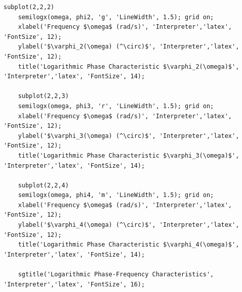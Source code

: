 \documentclass[a4paper, 12pt]{article}
\begin{document}
\begin{lstlisting}[label=task1, caption={Программа для задания 1}]
    subplot(2,2,2)
    semilogx(omega, phi2, 'g', 'LineWidth', 1.5); grid on;
    xlabel('Frequency $\omega$ (rad/s)', 'Interpreter','latex', 'FontSize', 12);
    ylabel('$\varphi_2(\omega) (^\circ)$', 'Interpreter','latex', 'FontSize', 12);
    title('Logarithmic Phase Characteristic $\varphi_2(\omega)$', 'Interpreter','latex', 'FontSize', 14);

    subplot(2,2,3)
    semilogx(omega, phi3, 'r', 'LineWidth', 1.5); grid on;
    xlabel('Frequency $\omega$ (rad/s)', 'Interpreter','latex', 'FontSize', 12);
    ylabel('$\varphi_3(\omega) (^\circ)$', 'Interpreter','latex', 'FontSize', 12);
    title('Logarithmic Phase Characteristic $\varphi_3(\omega)$', 'Interpreter','latex', 'FontSize', 14);

    subplot(2,2,4)
    semilogx(omega, phi4, 'm', 'LineWidth', 1.5); grid on;
    xlabel('Frequency $\omega$ (rad/s)', 'Interpreter','latex', 'FontSize', 12);
    ylabel('$\varphi_4(\omega) (^\circ)$', 'Interpreter','latex', 'FontSize', 12);
    title('Logarithmic Phase Characteristic $\varphi_4(\omega)$', 'Interpreter','latex', 'FontSize', 14);

    sgtitle('Logarithmic Phase-Frequency Characteristics', 'Interpreter','latex', 'FontSize', 16);
    \end{lstlisting}
\end{document}
